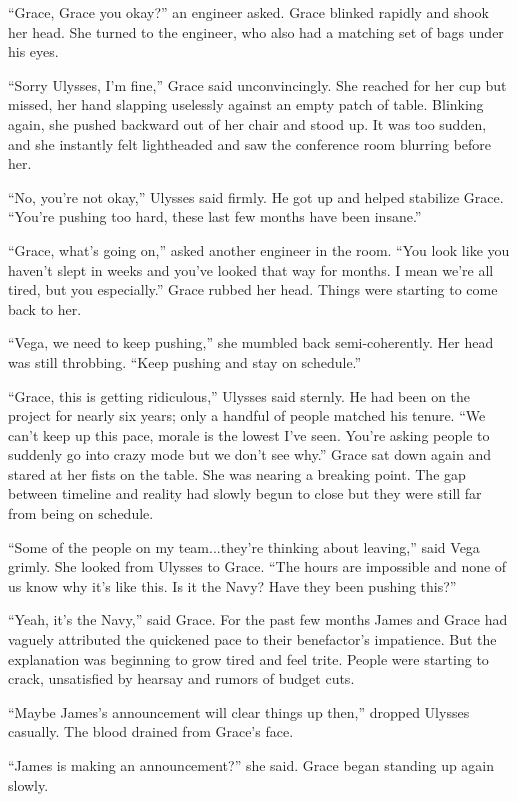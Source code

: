 \documentclass[12pt]{article} %
\begin{document}
``Grace, Grace you okay?'' an engineer asked. Grace blinked rapidly and shook her head. She turned to the engineer, who also had a matching set of bags under his eyes.

``Sorry Ulysses, I'm fine,'' Grace said unconvincingly. She reached for her cup but missed, her hand slapping uselessly against an empty patch of table. Blinking again, she pushed backward out of her chair and stood up. It was too sudden, and she instantly felt lightheaded and saw the conference room blurring before her.

``No, you're not okay,'' Ulysses said firmly. He got up and helped stabilize Grace. ``You're pushing too hard, these last few months have been insane.''

``Grace, what's going on,'' asked another engineer in the room. ``You look like you haven't slept in weeks and you've looked that way for months. I mean we're all tired, but you especially.'' Grace rubbed her head. Things were starting to come back to her.

``Vega, we need to keep pushing,'' she mumbled back semi-coherently. Her head was still throbbing. ``Keep pushing and stay on schedule.''

``Grace, this is getting ridiculous,'' Ulysses said sternly. He had been on the project for nearly six years; only a handful of people matched his tenure.  ``We can't keep up this pace, morale is the lowest I've seen. You're asking people to suddenly go into crazy mode but we don't see why.'' Grace sat down again and stared at her fists on the table. She was nearing a breaking point. The gap between timeline and reality had slowly begun to close but they were still far from being on schedule.

``Some of the people on my team...they're thinking about leaving,'' said Vega grimly. She looked from Ulysses to Grace. ``The hours are impossible and none of us know why it's like this. Is it the Navy? Have they been pushing this?''

``Yeah, it's the Navy,'' said Grace. For the past few months James and Grace had vaguely attributed the quickened pace to their benefactor's impatience. But the explanation was beginning to grow tired and feel trite. People were starting to crack, unsatisfied by hearsay  and rumors of budget cuts.

``Maybe James's announcement will clear things up then,'' dropped Ulysses casually. The blood drained from Grace's face.

``James is making an announcement?'' she said. Grace began standing up again slowly.
\end{document}
